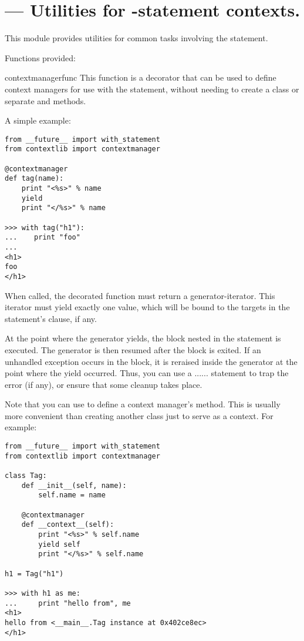 \section{ ---
         Utilities for -statement contexts.}



This module provides utilities for common tasks involving the
 statement.

Functions provided:

\begin{funcdesc}{contextmanager}{func}
This function is a decorator that can be used to define context managers
for use with the  statement, without needing to create a
class or separate  and  methods.

A simple example:

\begin{verbatim}
from __future__ import with_statement
from contextlib import contextmanager

@contextmanager
def tag(name):
    print "<%s>" % name
    yield
    print "</%s>" % name

>>> with tag("h1"):
...    print "foo"
...
<h1>
foo
</h1>
\end{verbatim}

When called, the decorated function must return a generator-iterator.
This iterator must yield exactly one value, which will be bound to the
targets in the  statement's  clause, if any.

At the point where the generator yields, the block nested in the
 statement is executed.  The generator is then resumed
after the block is exited.  If an unhandled exception occurs in the
block, it is reraised inside the generator at the point where the yield
occurred.  Thus, you can use a
...... statement to trap
the error (if any), or ensure that some cleanup takes place.

Note that you can use  to define a context
manager's  method.  This is usually more convenient
than creating another class just to serve as a context.  For example:

\begin{verbatim}
from __future__ import with_statement
from contextlib import contextmanager

class Tag:
    def __init__(self, name):
        self.name = name
        
    @contextmanager
    def __context__(self):
        print "<%s>" % self.name
        yield self
        print "</%s>" % self.name
        
h1 = Tag("h1")

>>> with h1 as me:
...     print "hello from", me
<h1>
hello from <__main__.Tag instance at 0x402ce8ec>
</h1>
\end{verbatim}
\end{funcdesc}

